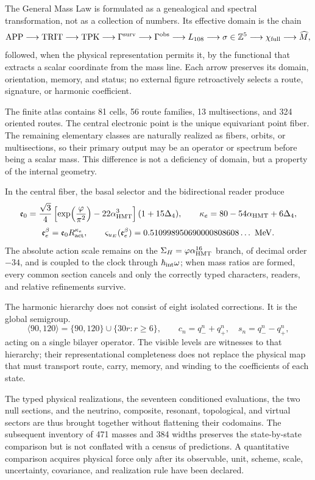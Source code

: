 The General Mass Law is formulated as a genealogical and
spectral transformation, not as a collection of numbers. Its effective domain is the chain
\[
\text{APP}\longrightarrow\text{TRIT}\longrightarrow\text{TPK}
\longrightarrow\Gamma^{\rm surv}\longrightarrow\Gamma^{\rm obs}
\longrightarrow L_{108}\longrightarrow\sigma\in\mathbb Z^5
\longrightarrow\chi_{\rm full}\longrightarrow\widehat M,
\]
followed, when the physical representation permits it, by the functional that
extracts a scalar coordinate from the mass line. Each arrow preserves its
domain, orientation, memory, and status; no external figure retroactively selects
a route, signature, or harmonic coefficient.

The finite atlas contains 81 cells, 56 route families, 13 multisections, and
324 oriented routes. The central electronic point is the unique equivariant point
fiber. The remaining elementary classes are naturally realized as
fibers, orbits, or multisections, so their primary output may be an
operator or spectrum before being a scalar mass. This difference is not a
deficiency of domain, but a property of the internal geometry.

In the central fiber, the basal selector and the bidirectional reader produce
\[
\mathfrak e_0
=\frac{\sqrt3}{4}
 \left[\exp\!\left(\frac{\varphi}{\pi^2}\right)
       -22\alpha_{\rm HMT}^3\right](1+15\Delta_4),
\qquad
\kappa_e=80-54\alpha_{\rm HMT}+6\Delta_4,
\]
\[
\mathfrak e_e^\beta=\mathfrak e_0R_{\rm act}^{\kappa_e},
\qquad
\varsigma_{u_E}(\mathfrak e_e^\beta)
=0.510998950690000808608\ldots\ \mathrm{MeV}.
\]
The absolute action scale remains on the
\(\Sigma_H=\varphi\alpha_{\rm HMT}^{16}\) branch, of decimal order \(-34\), and is
coupled to the clock through \(\hbar_{\rm int}\omega\); when mass ratios are formed,
every common section cancels and only the correctly typed characters,
readers, and relative refinements survive.

The harmonic hierarchy does not consist of eight isolated corrections. It is the global semigroup.
\[
\langle90,120\rangle
=\{90,120\}\cup\{30r:r\ge6\},
\qquad
c_n=q_-^n+q_+^n,
\quad s_n=q_-^n-q_+^n,
\]
acting on a single bilayer operator. The visible levels are witnesses to
that hierarchy; their representational completeness does not replace the physical map that
must transport route, carry, memory, and winding to the coefficients of each
state.

The typed physical realizations, the seventeen conditioned evaluations, the two null sections, and the neutrino, composite, resonant, topological, and virtual sectors are thus brought together without flattening their codomains. The subsequent inventory of 471 masses and 384 widths preserves the state-by-state comparison but is not conflated with a census of predictions. A quantitative comparison acquires physical force only after its observable, unit, scheme, scale, uncertainty, covariance, and realization rule have been declared.

